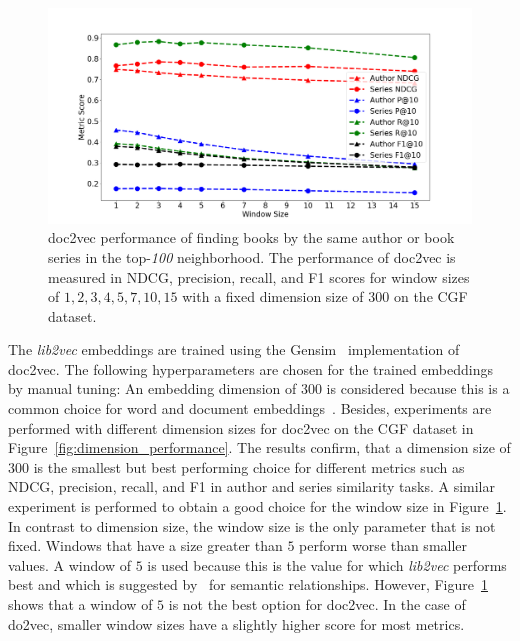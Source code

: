 \documentclass[11pt]{article}
\begin{document}
\begin{figure}
	\centering
	\includegraphics[width=\linewidth]{figures/doc_window_performance}
	\caption{doc2vec performance of finding  books by the same author or book series in the top-\textit{100} neighborhood.
		The performance of doc2vec is measured in NDCG, precision, recall, and F1 scores for window sizes of $1, 2, 3, 4, 5, 7, 10, 15$ with a fixed dimension size of $300$ on the CGF dataset.}
	\label{fig:doc_window_performance}
\end{figure}
The \emph{lib2vec} embeddings are trained using the Gensim~\citep{rehurek_lrec} implementation of doc2vec.
The following hyperparameters are chosen for the trained embeddings by manual tuning:
An embedding dimension of $300$ is considered because this is a common choice for word and document embeddings~\citep{rettig_fusing_2019}.
Besides, experiments are performed with different dimension sizes for doc2vec on the CGF dataset in Figure~\ref{fig:dimension_performance}.
The results confirm, that a dimension size of $300$ is the smallest but best performing choice for different metrics such as NDCG, precision, recall, and F1 in author and series similarity tasks.
A similar experiment is performed to obtain a good choice for the window size in Figure~\ref{fig:doc_window_performance}.
In contrast to dimension size, the window size is the only parameter that is not fixed.
Windows that have a size greater than $5$ perform worse than smaller values.
A window of $5$ is used because this is the value for which \emph{lib2vec} performs best and which is suggested by~\citet{grayson_novel2vec_2016} for semantic relationships.
However, Figure~\ref{fig:doc_window_performance} shows that a window of $5$ is not the best option for doc2vec.
In the case of do2vec, smaller window sizes have a slightly higher score for most metrics.
\end{document}
